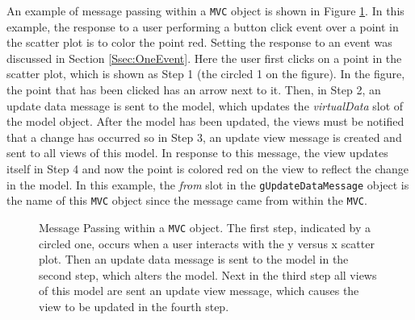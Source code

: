 \documentclass{article}[11pt]
\newcommand{\Robject}[1]{{\texttt{#1}}}
\newcommand{\Rslot}[1]{\textsl{#1}}
\begin{document}

An example of message passing within a \Robject{MVC} object is shown in Figure
\ref{Fig:MPwithin}.  In this example, the response to a user performing a
button click event over a point in the scatter plot is to color the point red.
Setting the response to an event was discussed in Section
\ref{Ssec:OneEvent}.  Here the user first clicks on a point in the
scatter plot, which is shown as Step 1 (the circled 1 on the figure).  In the
figure, the point that has been clicked has an arrow next to it.  Then, in
Step 2, an update data message is sent to the model, which updates
the \Rslot{virtualData} slot of the model object.  After the
model has been updated, the views must be notified that a
change has occurred so in Step 3, an update view message is created and sent
to all views of this model.  In response to this
message, the view updates itself in Step 4 and now the
point is colored red on the view to reflect the change in the
model.  In this example, the \Rslot{from} slot in the
\Robject{gUpdateDataMessage} object is the name of this \Robject{MVC} object
since the message came from within the \Robject{MVC}. 

\begin{figure}[ht]
  \begin{center}
    \caption{ Message Passing within a \Robject{MVC} object.  The first step,
      indicated by a circled one, occurs when a user interacts with the y
      versus x scatter plot.  Then an update data message is sent to the model
      in the second step, which alters the model.  Next in the third step all
      views of this model are sent an update view message, which causes the
      view to be updated in the fourth step. }
    \label{Fig:MPwithin}
  \end{center}
\end{figure}
\end{document}
